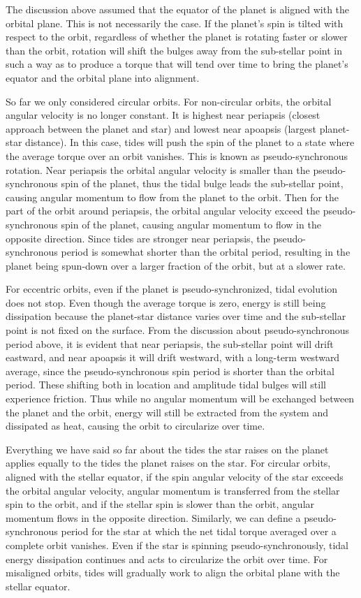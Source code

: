 The discussion above assumed that the equator of the planet is aligned with the
orbital plane. This is not necessarily the case. If the planet's spin is tilted
with respect to the orbit, regardless of whether the planet is rotating faster
or slower than the orbit, rotation will shift the bulges away from the
sub-stellar point in such a way as to produce a torque that will tend over time
to bring the planet's equator and the orbital plane into alignment.

So far we only considered circular orbits. For non-circular orbits, the orbital
angular velocity is no longer constant. It is highest near periapsis (closest
approach between the planet and star) and lowest near apoapsis (largest
planet-star distance). In this case, tides will push the spin of the planet to a
state where the average torque over an orbit vanishes. This is known as
pseudo-synchronous rotation. Near periapsis the orbital angular velocity is
smaller than the pseudo-synchronous spin of the planet, thus the tidal bulge
leads the sub-stellar point, causing angular momentum to flow from the planet to
the orbit. Then for the part of the orbit around periapsis, the orbital angular
velocity exceed the pseudo-synchronous spin of the planet, causing angular
momentum to flow in the opposite direction. Since tides are stronger near
periapsis, the pseudo-synchronous period is somewhat shorter than the orbital
period, resulting in the planet being spun-down over a larger fraction of the
orbit, but at a slower rate.

For eccentric orbits, even if the planet is pseudo-synchronized, tidal evolution
does not stop. Even though the average torque is zero, energy is still being
dissipation because the planet-star distance varies over time and the
sub-stellar point is not fixed on the surface. From the discussion about
pseudo-synchronous period above, it is evident that near periapsis, the
sub-stellar point will drift eastward, and near apoapsis it will drift westward,
with a long-term westward average, since the pseudo-synchronous spin period is
shorter than the orbital period. These shifting both in location and amplitude
tidal bulges will still experience friction. Thus while no angular momentum will
be exchanged between the planet and the orbit, energy will still be extracted
from the system and dissipated as heat, causing the orbit to circularize over
time.

Everything we have said so far about the tides the star raises on the planet
applies equally to the tides the planet raises on the star. For circular orbits,
aligned with the stellar equator, if the spin angular velocity of the star
exceeds the orbital angular velocity, angular momentum is transferred from the
stellar spin to the orbit, and if the stellar spin is slower than the orbit,
angular momentum flows in the opposite direction. Similarly, we can define a
pseudo-synchronous period for the star at which the net tidal torque averaged
over a complete orbit vanishes. Even if the star is spinning
pseudo-synchronously, tidal energy dissipation continues and acts to circularize
the orbit over time. For misaligned orbits, tides will gradually work to align
the orbital plane with the stellar equator.

